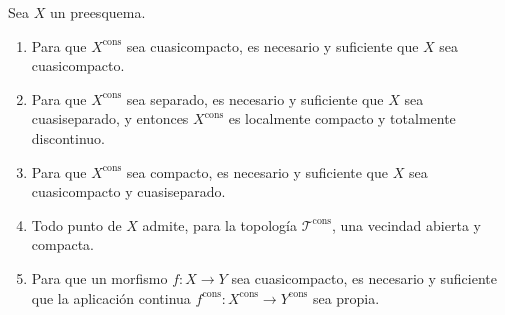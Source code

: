 \begin{proposition}[1.9.15]
\label{IV.1.9.15-fr}
Sea $X$ un preesquema.
\begin{enumerate}
  \item[\textup{(i)}] Para que $X^{\mathrm{cons}}$ sea cuasicompacto, es necesario y
  suficiente que $X$ sea cuasicompacto.
  \item[\textup{(ii)}] Para que $X^{\mathrm{cons}}$ sea separado, es necesario y suficiente
  que $X$ sea cuasiseparado, y entonces $X^{\mathrm{cons}}$ es localmente
  compacto y totalmente discontinuo.
  \item[\textup{(iii)}] Para que $X^{\mathrm{cons}}$ sea compacto, es necesario y suficiente
  que $X$ sea cuasicompacto y cuasiseparado.
  \item[\textup{(iv)}] Todo punto de $X$ admite, para la topología
  $\mathscr T^{\mathrm{cons}}$, una vecindad abierta y compacta.
  \item[\textup{(v)}] Para que un morfismo $f:X\to Y$ sea cuasicompacto, es necesario y
  suficiente que la aplicación continua
  $f^{\mathrm{cons}}:X^{\mathrm{cons}}\to Y^{\mathrm{cons}}$ sea propia.
\end{enumerate}
\end{proposition}

